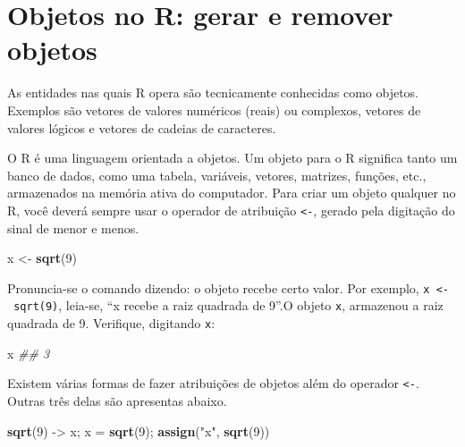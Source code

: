 \documentclass[
  11pt,
  a5paper,
  openany]{book}
\newenvironment{Shaded}{\begin{snugshade}}{\end{snugshade}}
\newcommand{\CommentTok}[1]{\textcolor[rgb]{0.56,0.35,0.01}{\textit{#1}}}
\newcommand{\DecValTok}[1]{\textcolor[rgb]{0.00,0.00,0.81}{#1}}
\newcommand{\KeywordTok}[1]{\textcolor[rgb]{0.13,0.29,0.53}{\textbf{#1}}}
\newcommand{\NormalTok}[1]{#1}
\newcommand{\StringTok}[1]{\textcolor[rgb]{0.31,0.60,0.02}{#1}}
\begin{document}
\hypertarget{objetos-no-r-gerar-e-remover-objetos}{%
\section{Objetos no R: gerar e remover objetos}\label{objetos-no-r-gerar-e-remover-objetos}}

As entidades nas quais R opera são tecnicamente conhecidas como objetos. Exemplos são vetores de valores numéricos (reais) ou complexos, vetores de valores lógicos e vetores de cadeias de caracteres.

O R é uma linguagem orientada a objetos. Um objeto para o R significa tanto um banco de dados, como uma tabela, variáveis, vetores, matrizes, funções, etc., armazenados na memória ativa do computador. Para criar um objeto qualquer no R, você deverá sempre usar o operador de atribuição \texttt{\textless{}-}, gerado pela digitação do sinal de menor e menos.

\begin{Shaded}
\begin{Highlighting}[]
\NormalTok{x <-}\StringTok{ }\KeywordTok{sqrt}\NormalTok{(}\DecValTok{9}\NormalTok{)}
\end{Highlighting}
\end{Shaded}

Pronuncia-se o comando dizendo: o objeto recebe certo valor. Por exemplo, \texttt{x\ \textless{}-\ sqrt(9)}, leia-se, ``x recebe a raiz quadrada de 9''.O objeto \texttt{x}, armazenou a raiz quadrada de 9. Verifique, digitando \texttt{x}:

\begin{Shaded}
\begin{Highlighting}[]
\NormalTok{x}
\CommentTok{## 3}
\end{Highlighting}
\end{Shaded}

Existem várias formas de fazer atribuições de objetos além do operador \texttt{\textless{}-}. Outras três delas são apresentas abaixo.

\begin{Shaded}
\begin{Highlighting}[]
\KeywordTok{sqrt}\NormalTok{(}\DecValTok{9}\NormalTok{) ->}\StringTok{ }\NormalTok{x; x =}\StringTok{ }\KeywordTok{sqrt}\NormalTok{(}\DecValTok{9}\NormalTok{); }\KeywordTok{assign}\NormalTok{(}\StringTok{"x"}\NormalTok{, }\KeywordTok{sqrt}\NormalTok{(}\DecValTok{9}\NormalTok{))}
\end{Highlighting}
\end{Shaded}
\end{document}
